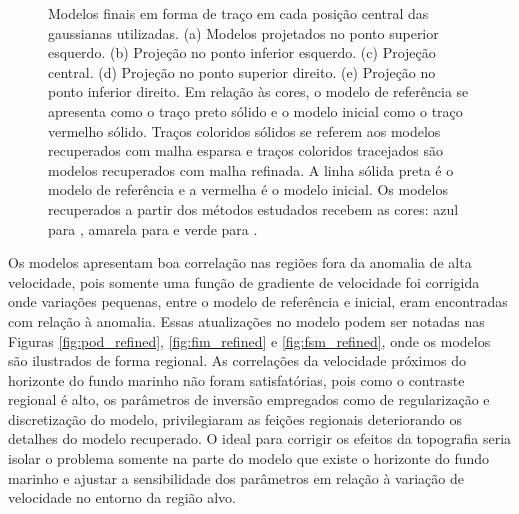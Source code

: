 \begin{figure}[H]
	
	\caption{Modelos finais em forma de traço em cada posição central das gaussianas utilizadas. (a) Modelos projetados no ponto superior esquerdo. (b) Projeção no ponto inferior esquerdo. (c) Projeção central. (d) Projeção no ponto superior direito. (e) Projeção no ponto inferior direito. Em relação às cores, o modelo de referência se apresenta como o traço preto sólido e o modelo inicial como o traço vermelho sólido. Traços coloridos sólidos se referem aos modelos recuperados com malha esparsa e traços coloridos tracejados são modelos recuperados com malha refinada. A linha sólida preta é o modelo de referência e a vermelha é o modelo inicial. Os modelos recuperados a partir dos métodos estudados recebem as cores: azul para , amarela para  e verde para . }
	\label{fig:model_profile}
\end{figure}

Os modelos apresentam boa correlação nas regiões fora da anomalia de alta velocidade, pois somente uma função de gradiente de velocidade foi corrigida onde variações pequenas, entre o modelo de referência e inicial, eram encontradas com relação à anomalia. Essas atualizações no modelo podem ser notadas nas Figuras \ref{fig:pod_refined}, \ref{fig:fim_refined} e \ref{fig:fsm_refined}, onde os modelos são ilustrados de forma regional. As correlações da velocidade próximos do horizonte do fundo marinho não foram satisfatórias, pois como o contraste regional é alto, os parâmetros de inversão empregados como de regularização e discretização do modelo, privilegiaram as feições regionais deteriorando os detalhes do modelo recuperado. O ideal para corrigir os efeitos da topografia seria isolar o problema somente na parte do modelo que existe o horizonte do fundo marinho e ajustar a sensibilidade dos parâmetros em relação à variação de velocidade no entorno da região alvo.  

